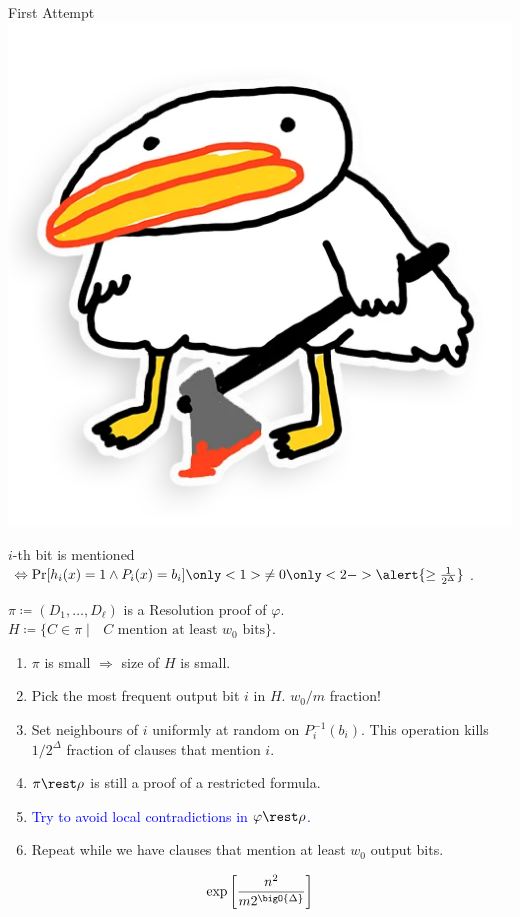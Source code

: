 \begin{frame}{First Attempt \hspace{0.2cm} \includegraphics[scale = 0.03]{pics/utia-blood.png}}

    $i$-th bit is mentioned $\Leftrightarrow \Pr[h_i(x) = 1 \land P_i(x) = b_i] \only<1>{\neq
        0}\only<2->{\alert{\ge \frac{1}{2^{\Delta}}}}$.

    \pause
    \pause
    $\pi \coloneqq (D_1, \dots, D_{\ell})$ is a Resolution proof of $\varphi$. $H \coloneqq \{C \in \pi
    \mid \text{ $C$ mention at least $w_0$ bits} \}$.

    \begin{enumerate}
        \item $\pi$ is small $\Rightarrow$ size of $H$ is small.
        \pause
        \item Pick the most frequent output bit $i$ in $H$. \alert{$w_0 / m$ fraction!}
        \pause
        \item Set \alert{neighbours} of $i$ uniformly at random on $P_i^{-1}(b_i)$. This
            operation kills \alert{$1 / 2^{\Delta}$ fraction} of clauses that mention $i$.
        \pause
        \item $\pi \rest \rho$ is still a proof of a restricted formula.
        \pause
        \item \textcolor{blue}{Try to avoid local contradictions in $\varphi \rest \rho$.}
        \pause    
        \item Repeat while we have clauses that \alert{mention at least $w_0$ output bits}.
    \end{enumerate}

    
    $$\exp\left[\frac{n^2}{m 2^{\bigO{\Delta}}}\right]$$
    
\end{frame}


